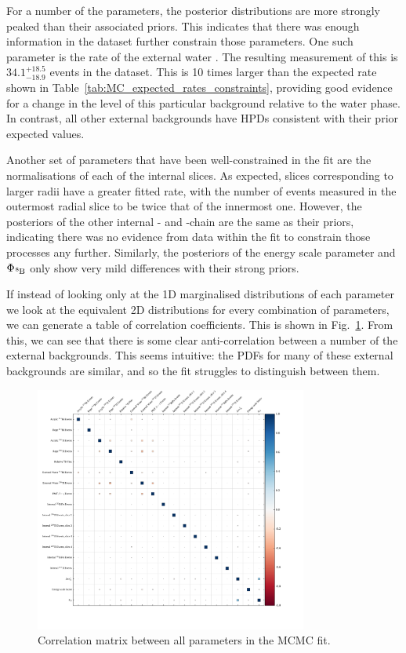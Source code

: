 For a number of the parameters, the posterior distributions are more strongly peaked than their associated priors. This indicates that there was enough information in the dataset further constrain those parameters. One such parameter is the rate of the external water . The resulting measurement of this is $34.1^{+18.5}_{-18.9}$ events in the dataset. This is 10 times larger than the expected rate shown in Table~\ref{tab:MC_expected_rates_constraints}, providing good evidence for a change in the level of this particular background relative to the water phase. In contrast, all other external backgrounds have HPDs consistent with their prior expected values.

Another set of parameters that have been well-constrained in the fit are the normalisations of each of the internal  slices. As expected, slices corresponding to larger radii have a greater fitted rate, with the number of events measured in the outermost radial slice to be twice that of the innermost one. However, the posteriors of the other internal - and -chain are the same as their priors, indicating there was no evidence from data within the fit to constrain those processes any further. Similarly, the posteriors of the energy scale parameter and $\Phi_{\beight{}}$ only show very mild differences with their strong priors.

If instead of looking only at the 1D marginalised distributions of each parameter we look at the equivalent 2D distributions for every combination of parameters, we can generate a table of correlation coefficients. This is shown in Fig.~\ref{fig:corr_plots_params}. From this, we can see that there is some clear anti-correlation between a number of the external backgrounds. This seems intuitive: the PDFs for many of these external backgrounds are similar, and so the fit struggles to distinguish between them.

\begin{figure}
    \centering
    \includegraphics[width=0.8\textwidth]{6_SolarAnalysis/images/corr_coeff.pdf}
    \caption[Correlation matrix between all parameters in the MCMC fit]
    {Correlation matrix between all parameters in the MCMC fit.}
    \label{fig:corr_plots_params}
\end{figure}

